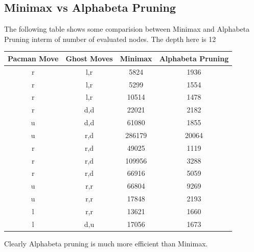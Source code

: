 \documentclass[a4paper, 11pt]{article}
\begin{document}
\subsection{Minimax vs Alphabeta Pruning}
The following table shows some comparision between Minimax and Alphabeta Pruning interm of number of evaluated nodes. The depth here is 12
\begin{table}[ht]
  \centering
  \begin{tabular}{|c|c|c|c|}
    \hline
    Pacman Move & Ghost Moves & Minimax & Alphabeta Pruning \\ \hline
    r           & l,r         & 5824    & 1936              \\ \hline
    r           & l,r         & 5299    & 1554              \\ \hline
    r           & l,r         & 10514   & 1478              \\ \hline
    r           & d,d         & 22021   & 2182              \\ \hline
    u           & d,d         & 61080   & 1855              \\ \hline
    u           & r,d         & 286179  & 20064             \\ \hline
    r           & r,d         & 49025   & 1119              \\ \hline
    r           & r,d         & 109956  & 3288              \\ \hline
    r           & r,d         & 66916   & 5059              \\ \hline
    u           & r,r         & 66804   & 9269              \\ \hline 
    u           & r,r         & 17848   & 2193              \\ \hline
    l           & r,r         & 13621   & 1660              \\ \hline
    l           & d,u         & 17056   & 1673              \\ 
    \hline
  \end{tabular}
\end{table}

Clearly Alphabeta pruning is much more efficient than Minimax. 
\end{document}
